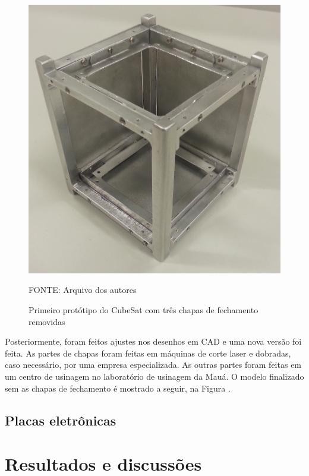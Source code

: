 \documentclass[
	12pt,				%
	openany,			%
	twoside,			%
	a4paper,			%
	english,			%
	french,				%
	spanish,			%
	brazil,				%
	oldfontcommands
	]{abntex2}
\begin{document}
\begin{figure}[ht]
	\caption{Primeiro protótipo do CubeSat com três chapas de fechamento removidas}
	\centering
	\includegraphics[width=0.5\linewidth]{./figs/PrototypeOne}
	
	\begin{small}
		FONTE: Arquivo dos autores
	\end{small}
	\label{fig:Protoone}
\end{figure}


Posteriormente, foram feitos ajustes nos desenhos em CAD e uma nova versão foi feita. As partes de chapas foram feitas em máquinas de corte laser e dobradas, caso necessário, por uma empresa especializada. As outras partes foram feitas em um centro de usinagem no laboratório de usinagem da Mauá. O modelo finalizado sem as chapas de fechamento é mostrado a seguir, na Figura .

%	

\section{Placas eletrônicas}



\chapter[Resultados e discussões]{Resultados e discussões}
\end{document}
